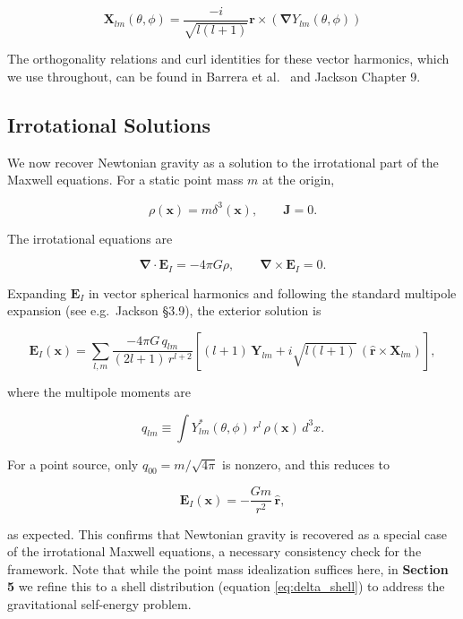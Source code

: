 \documentclass {article}
\renewcommand\vec{\mathbf}
\let\OldS\nabla
\renewcommand{\nabla}{\boldsymbol{\OldS}}
\let\OldHat\hat
\renewcommand{\hat}[1]{\OldHat{\mathbf{#1}}}
\begin{document}
\begin{equation}
\vec X_{lm}(\theta, \phi) = \frac {-i}{\sqrt{l(l+1)}} \vec r \times \left( \nabla Y_{lm}(\theta, \phi) \right) 
\label{eq:xlm}
\end{equation}

The orthogonality relations and curl identities for these vector harmonics, which we use throughout, can be found in Barrera et al.\ \cite{barrera1985} and Jackson \cite{jackson} Chapter 9.

\subsection{Irrotational Solutions}

We now recover Newtonian gravity as a solution to the irrotational part of the Maxwell equations. For a static point mass $m$ at the origin,

\begin{equation}
\rho(\vec{x}) = m\delta^3(\vec{x}), \qquad \vec{J} = 0.
\end{equation}

\noindent The irrotational equations are

\begin{equation}
\nabla \cdot \vec{E}_I = -4\pi G \rho, \qquad \nabla \times \vec{E}_I = 0.
\end{equation}

\noindent Expanding $\vec{E}_I$ in vector spherical harmonics and following the standard multipole expansion (see e.g.\ Jackson \S 3.9), the exterior solution is

\begin{equation}
\vec{E}_I(\vec{x}) = \sum_{l,m} \frac{-4\pi G\,q_{lm}}{(2l+1)\,r^{l+2}} \left[(l+1)\,\vec{Y}_{lm} + i\sqrt{l(l+1)}\,(\hat{r} \times \vec{X}_{lm})\right],
\end{equation}

\noindent where the multipole moments are

\begin{equation}
q_{lm} \equiv \int Y_{lm}^*(\theta,\phi)\,r^l\,\rho(\vec{x})\,d^3x.
\end{equation}

\noindent For a point source, only $q_{00} = m/\sqrt{4\pi}$ is nonzero, and this reduces to

\begin{equation}
\vec{E}_I(\vec{x}) = -\frac{Gm}{r^2}\,\hat{r},
\end{equation}

\noindent as expected. This confirms that Newtonian gravity is recovered as a special case of the irrotational Maxwell equations, a necessary consistency check for the framework. Note that while the point mass idealization suffices here, in \textbf{Section 5} we refine this to a shell distribution (equation \ref{eq:delta_shell}) to address the gravitational self-energy problem.
\end{document}
